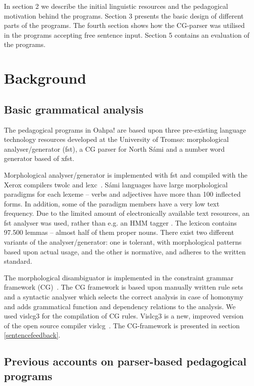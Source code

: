 \documentclass[11pt]{article}
\begin{document}
In section 2 we describe the initial linguistic resources and the pedagogical motivation behind the programs. Section 3 presents the basic design of different parts of the programs. The fourth section shows how the CG-parser was utilised in the programs accepting free sentence input. Section 5 contains an evaluation of the programs.


\section{Background}

\subsection{Basic grammatical analysis}

The pedagogical programs in Oahpa! are based upon three pre-existing language technology resources developed at the University of Tromsø: morphological analyser/generator (fst), a CG parser for North Sámi and a number word generator based of xfst.

Morphological analyser/generator is implemented with fst and compiled with the Xerox compilers twolc and lexc~\cite{BeesleyKarttunen:03}. Sámi languages have large morphological paradigms for each lexeme -- verbs and adjectives have more than 100 inflected forms. In addition, some of the paradigm members have a very low text frequency. Due to the limited amount of electronically available text resources, an fst analyser was used, rather than e.g. an HMM tagger \cite{Trosterud:07}. The lexicon contains 97.500 lemmas -- almost half of them proper nouns. There exist two different variants of the analyser/generator: one is tolerant, with morphological patterns based upon actual usage, and the other is normative, and adheres to the written standard.  

The morphological disambiguator is implemented in the constraint grammar framework (CG)~\cite{Karlsson:95}. The CG framework is based upon manually written rule sets and a syntactic analyser which selects the correct analysis in case of homonymy and adds grammatical function and dependency relations to the analysis. We used vislcg3 for the compilation of CG rules. Vislcg3 is a new, improved version of the open source compiler vislcg~\cite{Visl:08}. The CG-framework is presented in section \ref{sentencefeedback}. 

\subsection{Previous accounts on parser-based pedagogical programs}
\end{document}
